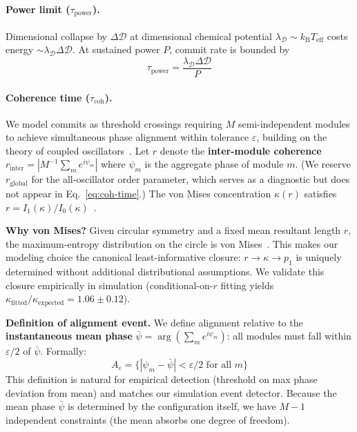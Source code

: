 \documentclass[12pt]{article}
\newcommand{\kB}{k_{\mathrm{B}}}
\newcommand{\Teff}{T_{\mathrm{eff}}}
\begin{document}
\paragraph{Power limit ($\tau_{\mathrm{power}}$).} Dimensional collapse by $\Delta\mathcal{D}$ at dimensional chemical potential $\lambda_{\mathcal{D}} \sim \kB\Teff$ costs energy $\sim \lambda_{\mathcal{D}}\Delta\mathcal{D}$. At sustained power $P$, commit rate is bounded by
\[
\tau_{\mathrm{power}} = \frac{\lambda_{\mathcal{D}}\Delta\mathcal{D}}{P}
\]

\paragraph{Coherence time ($\tau_{\mathrm{coh}}$).}
We model commits as threshold crossings requiring $M$ semi-independent modules to achieve simultaneous phase alignment within tolerance $\varepsilon$, building on the theory of coupled oscillators~\cite{kuramoto1984,acebron2005}.
Let $r$ denote the \textbf{inter-module coherence} $r_{\mathrm{inter}} = |M^{-1}\sum_m e^{i\psi_m}|$ where $\psi_m$ is the aggregate phase of module $m$. (We reserve $r_{\mathrm{global}}$ for the all-oscillator order parameter, which serves as a diagnostic but does not appear in Eq.~\ref{eq:coh-time}.) The von Mises concentration $\kappa(r)$ satisfies $r=I_1(\kappa)/I_0(\kappa)$~\cite{mardia2000}.

\textbf{Why von Mises?} Given circular symmetry and a fixed mean resultant length $r$, the maximum-entropy distribution on the circle is von Mises~\cite{mardia2000}. This makes our modeling choice the canonical least-informative closure: $r \to \kappa \to p_1$ is uniquely determined without additional distributional assumptions. We validate this closure empirically in simulation (conditional-on-$r$ fitting yields $\kappa_{\mathrm{fitted}}/\kappa_{\mathrm{expected}} = 1.06 \pm 0.12$).

\textbf{Definition of alignment event.} We define alignment relative to the \textbf{instantaneous mean phase} $\bar{\psi} = \arg(\sum_m e^{i\psi_m})$: all modules must fall within $\varepsilon/2$ of $\bar{\psi}$. Formally:
\[
A_\varepsilon = \{|\psi_m - \bar{\psi}| < \varepsilon/2 \text{ for all } m\}
\]
This definition is natural for empirical detection (threshold on max phase deviation from mean) and matches our simulation event detector. Because the mean phase $\bar{\psi}$ is determined by the configuration itself, we have $M-1$ independent constraints (the mean absorbs one degree of freedom).
\end{document}
